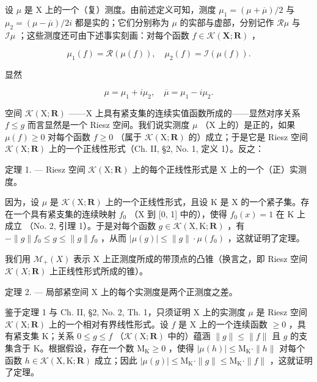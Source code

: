 设 \(\mu\) 是 X 上的一个（复）测度。由前述定义可知，测度 \(\mu_{1} = (\mu +\overline{\mu}) / 2\) 与 \(\mu_{2} = (\mu -\overline{\mu}) / 2i\) 都是实的；它们分别称为 \(\mu\) 的实部与虚部，分别记作 \(\mathcal{R}\mu\) 与 \(\mathcal{I}\mu\) ；这些测度还可由下述事实刻画：对每个函数 \(f\in \mathcal{K}(\mathbf{X};\mathbf{R})\) ，

\[
\mu_ {1} (f) = \mathcal {R} (\mu (f)), \quad \mu_ {2} (f) = \mathcal {I} (\mu (f)).
\]

显然

\[
\mu = \mu_ {1} + i \mu_ {2}, \quad \overline {{{{\mu}}}} = \mu_ {1} - i \mu_ {2}.
\]

空间 \(\mathcal{K}(\mathrm{X};\mathbf{R})\) ——\(\mathrm{X}\) 上具有紧支集的连续实值函数所成的——显然对序关系 \(f\leqslant g\) 而言显然是一个 Riesz 空间。我们说实测度 \(\mu\) （\(\mathrm{X}\) 上的）是正的，如果 \(\mu (f)\geqslant 0\) 对每个函数 \(f\geqslant 0\) （属于 \(\mathcal{K}(\mathrm{X};\mathbf{R})\) 的）成立；于是它是 Riesz 空间 \(\mathcal{K}(\mathrm{X};\mathbf{R})\) 上的一个正线性形式（Ch. II, §2, No. 1, 定义 1）。反之：

定理 1. --- Riesz 空间 \(\mathcal{K}(\mathrm{X};\mathbf{R})\) 上的每个正线性形式是 \(\mathrm{X}\) 上的一个（正）实测度。

因为，设 \(\mu\) 是 \(\mathcal{K}(\mathrm{X};\mathbf{R})\) 上的一个正线性形式，且设 \(\mathrm{K}\) 是 \(\mathrm{X}\) 的一个紧子集。存在一个具有紧支集的连续映射 \(f_0\) （\(\mathrm{X}\) 到 {[}0, 1{]} 中的），使得 \(f_0(x) = 1\) 在 \(\mathrm{K}\) 上成立 （No. 2, 引理 1）。于是对每个函数 \(g \in \mathcal{K}(\mathrm{X},\mathrm{K};\mathbf{R})\) ，有 \(-\| g \| f_0 \leqslant g \leqslant \| g \| f_0\) ，从而 \(|\mu(g)| \leqslant \| g \| \cdot \mu(f_0)\) ，这就证明了定理。

我们用 \(\mathcal{M}_{+}(X)\) 表示 X 上正测度所成的带顶点的凸锥（换言之，即 Riesz 空间 \(\mathcal{K}(X;\mathbf{R})\) 上正线性形式所成的锥）。

定理 2. --- 局部紧空间 X 上的每个实测度是两个正测度之差。

鉴于定理 1 与 Ch. II, §2, No. 2, Th. 1，只须证明 X 上的实测度 \(\mu\) 是 Riesz 空间 \(\mathcal{K}(\mathrm{X};\mathbf{R})\) 上的一个相对有界线性形式。设 \(f\) 是 X 上的一个连续函数 \(\geqslant 0\) ，具有紧支集 K；关系 \(0 \leqslant g \leqslant f\) （\(\mathcal{K}(\mathrm{X};\mathbf{R})\) 中的）蕴涵 \(\|g\| \leqslant \|f\|\) 且 \(g\) 的支集含于 K。根据假设，存在一个数 \(\mathrm{M}_{\mathrm{K}} \geqslant 0\) ，使得 \(|\mu(h)| \leqslant \mathrm{M}_{\mathrm{K}} \cdot \|h\|\) 对每个函数 \(h \in \mathcal{K}(\mathrm{X},\mathrm{K};\mathbf{R})\) 成立；因此 \(|\mu(g)| \leqslant \mathrm{M}_{\mathrm{K}} \cdot \|g\| \leqslant \mathrm{M}_{\mathrm{K}} \cdot \|f\|\) ，这就证明了定理。

